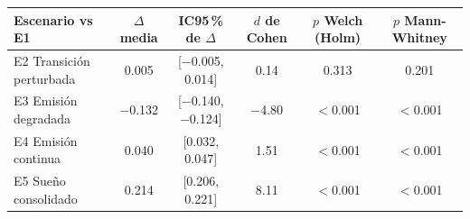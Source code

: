 \begin{tabular}{lccccc}
\toprule
\textbf{Escenario vs E1} & \textbf{$\Delta$ media} & \textbf{IC95\,\% de $\Delta$} & \textbf{$d$ de Cohen} & \textbf{$p$ Welch (Holm)} & \textbf{$p$ Mann-Whitney} \\
\midrule
E2 Transición perturbada & 0.005 & [\ensuremath{-}0.005, 0.014] & 0.14 & 0.313 & 0.201 \\
E3 Emisión degradada & \ensuremath{-}0.132 & [\ensuremath{-}0.140, \ensuremath{-}0.124] & \ensuremath{-}4.80 & $<$0.001 & $<$0.001 \\
E4 Emisión continua & 0.040 & [0.032, 0.047] & 1.51 & $<$0.001 & $<$0.001 \\
E5 Sueño consolidado & 0.214 & [0.206, 0.221] & 8.11 & $<$0.001 & $<$0.001 \\
\bottomrule
\end{tabular}
